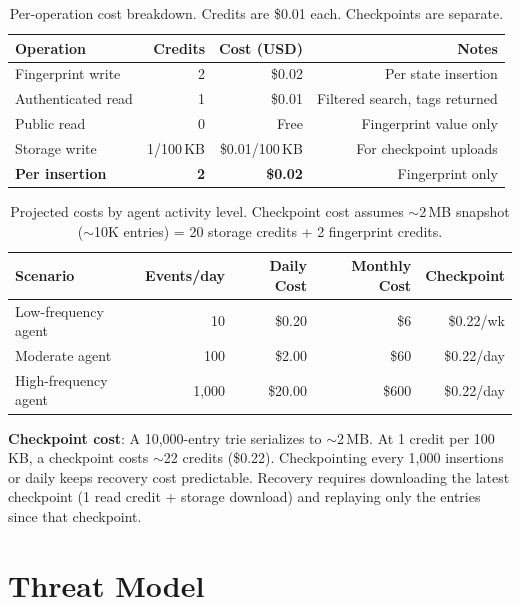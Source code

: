 \documentclass[11pt,a4paper]{article}
\begin{document}
\begin{table}[H]
\centering
\begin{tabular}{@{}lrrr@{}}
\toprule
\textbf{Operation} & \textbf{Credits} & \textbf{Cost (USD)} & \textbf{Notes} \\
\midrule
Fingerprint write     & 2 & \$0.02 & Per state insertion \\
Authenticated read    & 1 & \$0.01 & Filtered search, tags returned \\
Public read           & 0 & Free   & Fingerprint value only \\
Storage write         & 1/100\,KB & \$0.01/100\,KB & For checkpoint uploads \\
\midrule
\textbf{Per insertion} & \textbf{2} & \textbf{\$0.02} & Fingerprint only \\
\bottomrule
\end{tabular}
\caption{Per-operation cost breakdown. Credits are \$0.01 each. Checkpoints are separate.}
\label{tab:costs}
\end{table}

\begin{table}[H]
\centering
\begin{tabular}{@{}lrrrr@{}}
\toprule
\textbf{Scenario} & \textbf{Events/day} & \textbf{Daily Cost} & \textbf{Monthly Cost}
  & \textbf{Checkpoint} \\
\midrule
Low-frequency agent   & 10    & \$0.20    & \$6     & \$0.22/wk \\
Moderate agent        & 100   & \$2.00    & \$60    & \$0.22/day \\
High-frequency agent  & 1,000 & \$20.00   & \$600   & \$0.22/day \\
\bottomrule
\end{tabular}
\caption{Projected costs by agent activity level. Checkpoint cost assumes $\sim$2\,MB
snapshot ($\sim$10K entries) = 20 storage credits + 2 fingerprint credits.}
\label{tab:scenarios}
\end{table}

\textbf{Checkpoint cost}: A 10,000-entry trie serializes to $\sim$2\,MB. At 1 credit per
100\,KB, a checkpoint costs $\sim$22 credits (\$0.22). Checkpointing every 1,000 insertions
or daily keeps recovery cost predictable. Recovery requires downloading the latest
checkpoint (1 read credit + storage download) and replaying only the entries since that
checkpoint.


\section{Threat Model}
\end{document}
